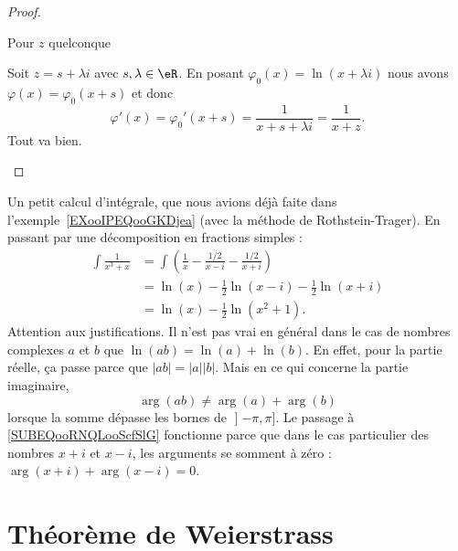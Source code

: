 \begin{proof}
\begin{subproof}
		\item[Pour \( z\) quelconque]

		Soit \( z=s+\lambda i\) avec \( s,\lambda\in \eR\). En posant \( \varphi_0(x)=\ln(x+\lambda i)\) nous avons \( \varphi(x)=\varphi_0(x+s)\) et donc
		\begin{equation}
			\varphi'(x)=\varphi_0'(x+s)=\frac{ 1 }{ x+s+\lambda i }=\frac{1}{ x+z }.
		\end{equation}
		Tout va bien.

	\end{subproof}
\end{proof}

\begin{example}     \label{EXooAKEDooZgjocX}
	Un petit calcul d'intégrale, que nous avions déjà faite dans l'exemple~\ref{EXooIPEQooGKDjea} (avec la méthode de Rothstein-Trager). En passant par une décomposition en fractions simples :
	\begin{subequations}
		\begin{align}
			\int\frac{1}{ x^3+x } & =\int\left( \frac{1}{ x }-\frac{ 1/2 }{ x-i }-\frac{ 1/2 }{ x+i } \right) \\
			                      & =\ln(x)-\frac{ 1 }{2}\ln(x-i)-\frac{ 1 }{2}\ln(x+i)                       \\
			                      & =\ln(x)-\frac{ 1 }{2}\ln(x^2+1).       \label{SUBEQooRNQLooScfSlG}
		\end{align}
	\end{subequations}
	Attention aux justifications. Il n'est pas vrai en général dans le cas de nombres complexes \( a\) et \( b\) que \( \ln(ab)=\ln(a)+\ln(b)\). En effet, pour la partie réelle, ça passe parce que \( | ab |=| a | |b |\). Mais en ce qui concerne la partie imaginaire,
	\begin{equation}
		\arg(ab)\neq \arg(a)+\arg(b)
	\end{equation}
	lorsque la somme dépasse les bornes de \( \mathopen] -\pi , \pi \mathclose]\). Le passage à \eqref{SUBEQooRNQLooScfSlG} fonctionne parce que dans le cas particulier des nombres \( x+i\) et \( x-i\), les arguments se somment à zéro : \( \arg(x+i)+\arg(x-i)=0\).
\end{example}

\section{Théorème de Weierstrass}

